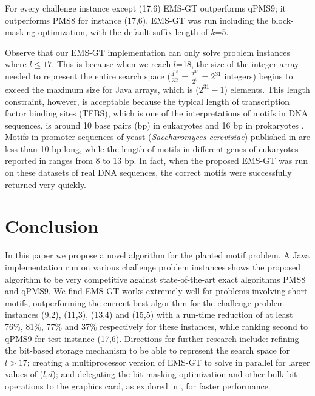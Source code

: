 \documentclass{acm_proc_article-sp}
\begin{document}
		
		For every challenge instance except (17,6) EMS-GT outperforms qPMS9; it outperforms PMS8 for instance (17,6). EMS-GT was run including the block-masking optimization, with the default suffix length of $k$=5. 

		Observe that our EMS-GT implementation can only solve problem instances where $l \leq 17$. This is because when we reach $l$=18, the size of the integer array needed to represent the entire search space ($\frac{4^{18}}{32} = \frac{2^{36}}{2^{5}} = 2^{31}$ integers) begins to exceed the maximum size for Java arrays, which is ($2^{31} - 1$) elements. This length constraint, however, is acceptable because the typical length of transcription factor binding sites (TFBS), which is one of the interpretations of motifs in DNA sequences, is around 10 base pairs (bp) in eukaryotes and 16 bp in prokaryotes \cite{stewart2012transcription}. Motifs in promoter sequences of yeast (\emph{Saccharomyces cerevisiae}) published in \cite{zhu1999scpd} are less than 10 bp long, while the length of motifs in different genes of eukaryotes reported in \cite{blanchette2002discovery} ranges from 8 to 13 bp.  In fact, when the proposed EMS-GT was run on these datasets of real DNA sequences, the correct motifs were successfully returned very quickly.




\section{Conclusion}
	In this paper we propose a novel algorithm for the planted motif problem. A Java implementation run on various challenge problem instances shows the proposed algorithm to be very competitive against state-of-the-art exact algorithms PMS8 and qPMS9. We find EMS-GT works extremely well for problems involving short motifs, outperforming the current best algorithm for the challenge problem instances (9,2), (11,3), (13,4) and (15,5) with a run-time reduction of at least 76\%, 81\%, 77\% and 37\% respectively for these instances, while ranking second to qPMS9 for test instance (17,6). Directions for further research include: refining the bit-based storage mechanism to be able to represent the search space for $l > 17$; creating a multiprocessor version of EMS-GT to solve in parallel for larger values of ($l$,$d$); and delegating the bit-masking optimization and other bulk bit operations to the graphics card, as explored in \cite{dasari2010efficient}, for faster performance.

\newpage


\end{document}
